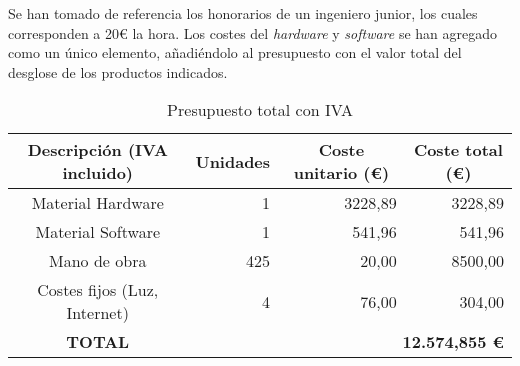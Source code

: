 \vspace{0.5cm}

Se han tomado de referencia los honorarios de un ingeniero junior, los cuales corresponden a 20€ la hora. Los costes del \textit{hardware} y \textit{software} se han agregado como un único elemento, añadiéndolo al presupuesto con el valor total del desglose de los productos indicados.

\vspace{0.5cm}

\begin{table}[ht]
\centering
\begin{tabular}{|c|r|r|r|}
\hline
\rowcolor[HTML]{EFEFEF} 
\textbf{Descripción (IVA incluido)} & \multicolumn{1}{c|}{\cellcolor[HTML]{EFEFEF}\textbf{Unidades}} & \multicolumn{1}{c|}{\cellcolor[HTML]{EFEFEF}\textbf{Coste unitario (€)}} & \multicolumn{1}{c|}{\cellcolor[HTML]{EFEFEF}\textbf{Coste total (€)}} \\ \hline
Material Hardware                   & 1                                                              & 3228,89                                                                  & 3228,89                                                               \\ \hline
Material Software                   & 1                                                              & 541,96                                                                   & 541,96                                                                \\ \hline
Mano de obra                        & 425                                                            & 20,00                                                                    & 8500,00                                                              \\ \hline
Costes fijos (Luz, Internet)                       & 4                                                              & 76,00                                                                    & 304,00                                                                \\ \hline
\rowcolor[HTML]{FFFFC7} 
\textbf{TOTAL}          & \multicolumn{3}{r|}{\cellcolor[HTML]{FFFFC7}\textbf{12.574,85‬‬5 €‬}}                                                                                                                                               \\ \hline
\end{tabular}
\caption{Presupuesto total con IVA}
\label{tab:budget}
\end{table}